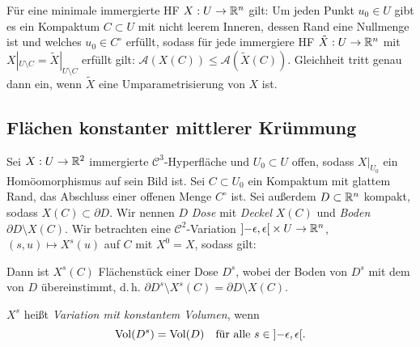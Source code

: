 \documentclass{cheat-sheet}
\newcommand{\A}{\mathcal{A}}
\begin{document}
\begin{samepage}

\begin{satz}
  Für eine minimale immergierte HF $X : U \to \mathbb{R}^n$ gilt: Um jeden Punkt $u_0 \in U$ gibt es ein Kompaktum $C \subset U$ mit nicht leerem Inneren, dessen Rand eine Nullmenge ist und welches $u_0 \in C^\circ$ erfüllt, sodass für jede immergiere HF $\tilde{X} : U \to \mathbb{R}^n$ mit $X|_{U \setminus C} = \tilde{X}|_{U \setminus C}$ erfüllt gilt: $\A(X(C)) \leq \A(\tilde{X}(C))$. Gleichheit tritt genau dann ein, wenn $\tilde{X}$ eine Umparametrisierung von $X$ ist.
\end{satz}



\subsection{Flächen konstanter mittlerer Krümmung}

\end{samepage}

\begin{situation}
  Sei $X : U \to \mathbb{R}^2$ immergierte $\mathcal{C}^3$-Hyperfläche und $U_0 \subset U$ offen, sodass $X|_{U_0}$ ein Homöomorphismus auf sein Bild ist. Sei $C \subset U_0$ ein Kompaktum mit glattem Rand, das Abschluss einer offenen Menge $C^\circ$ ist. Sei außerdem $D \subset \mathbb{R}^n$ kompakt, sodass $X(C) \subset \partial D$. Wir nennen $D$ \emph{Dose} mit \emph{Deckel} $X(C)$ und \emph{Boden} $\partial D \setminus X(C)$. Wir betrachten eine $\mathcal{C}^2$-Variation $\left] -\epsilon, \epsilon \right[ \times U \to \mathbb{R}^n$, $(s, u) \mapsto X^s(u)$ auf $C$ mit $X^0 = X$, sodass gilt:

  \begin{itemize}
  \end{itemize}

  Dann ist $X^s(C)$ Flächenstück einer Dose $D^s$, wobei der Boden von $D^s$ mit dem von $D$ übereinstimmt, d.\,h. $\partial D^s \setminus X^s(C) = \partial D \setminus X(C)$.
\end{situation}

\begin{defn}
  $X^s$ heißt \emph{Variation mit konstantem Volumen}, wenn
  \[
    \mathrm{Vol}(D^s) = \mathrm{Vol}(D)
    \quad \text{für alle $s \in \left] -\epsilon, \epsilon \right[$}.
  \]
\end{defn}
\end{document}
